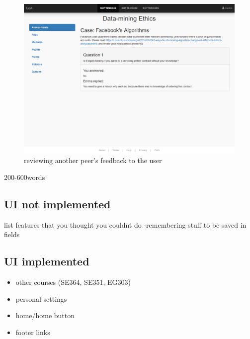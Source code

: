 \documentclass[10pt,a4paper]{article}
\begin{document}
	\begin{figure}[H]
		\centering
		\includegraphics[width=\textwidth]{5 - Data-mining Ethics.PNG}
		\caption{reviewing another peer's feedback to the user}
		\label{fig:five}
	\end{figure}





	200-600words
	\subsection*{UI not implemented}
		list features that you thought you couldnt do
		-remembering stuff to be saved in fields
	\subsection*{UI implemented}
		\begin{itemize}
			\item other courses (SE364, SE351, EG303)
			\item personal settings
			\item home/home button
			\item footer links
		\end{itemize}
\end{document}
